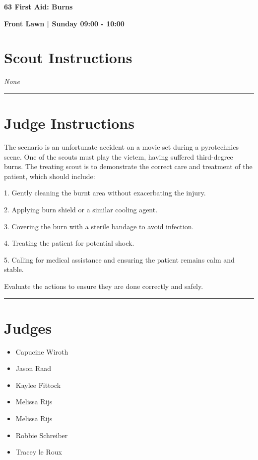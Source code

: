 \documentclass[10pt]{article}
\newcommand{\newtitle}[1]{\begin{center}{\Huge\bfseries #1 }\\ \vspace{5mm}\end{center}}
\newcommand{\newsubtitle}[1]{\begin{center}{\color{grey}\Large\bfseries #1 }\\ \vspace{5mm}\end{center}}
\begin{document}
	\vspace{1cm}


	\clearpage
		\newtitle{63 First Aid: Burns }
	\newsubtitle{Front Lawn | Sunday 09:00 - 10:00}
		\setcounter{section}{62}
	\section*{Scout Instructions}
		\textit{None}
	
	\vspace{0.5cm}
	\hrule
	\vspace{0.5cm}

		\section*{Judge Instructions}
		The scenario is an unfortunate accident on a movie set during a pyrotechnics scene. One of the scouts must play the victem, having suffered third-degree burns. The treating scout is to demonstrate the correct care and treatment of the patient, which should include:

1. Gently cleaning the burnt area without exacerbating the injury.

2. Applying burn shield or a similar cooling agent.

3. Covering the burn with a sterile bandage to avoid infection.

4. Treating the patient for potential shock.

5. Calling for medical assistance and ensuring the patient remains calm and stable.



Evaluate the actions to ensure they are done correctly and safely.


\vspace{0.5cm}
	\hrule
	\vspace{0.5cm}
		\section*{\faUsers \: Judges}

		

	\begin{multicols}{2}

		\begin{itemize}
									\item Capucine Wiroth
									\item Jason Raad
									\item Kaylee Fittock
									\item Melissa Rijs
						\end{itemize}

		\vfill\null
		\columnbreak

		\begin{itemize}
									\item Melissa Rijs
									\item Robbie Schreiber
									\item Tracey le Roux
						\end{itemize}

		\vfill\null

		\end{multicols}
\end{document}
